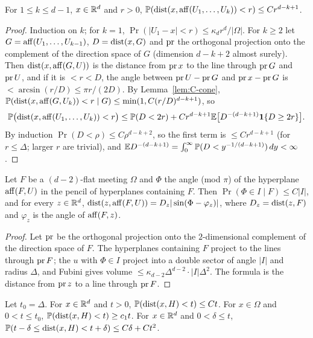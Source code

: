 \begin{lemma}\label{lem:C-flat}
For $1 \le k \le d - 1$, $x \in \mathbb{R}^d$ and $r > 0$, $\mathbb{P}(\operatorname{dist}(x, \operatorname{aff}(U_1, \dots, U_k)) < r) \le Cr^{d-k+1}$.
\end{lemma}

\begin{proof}
Induction on $k$; for $k = 1$, $\Pr(|U_1 - x| < r) \le \kappa_dr^d/|\Omega|$. For $k \ge 2$ let
$G = \operatorname{aff}(U_1, \dots, U_{k-1})$, $D = \operatorname{dist}(x, G)$ and $\operatorname{pr}$ the orthogonal projection onto the complement of the
direction space of $G$ (dimension $d - k + 2$ almost surely). Then $\operatorname{dist}(x, \operatorname{aff}(G, U))$ is the distance from
$\operatorname{pr} x$ to the line through $\operatorname{pr} G$ and $\operatorname{pr} U$, and if it is $< r < D$, the angle between $\operatorname{pr} U - \operatorname{pr} G$ and
$\operatorname{pr} x - \operatorname{pr} G$ is $< \arcsin(r/D) \le \pi r/(2D)$. By Lemma~\ref{lem:C-cone},
$\mathbb{P}(\operatorname{dist}(x, \operatorname{aff}(G, U_k)) < r \mid G) \le \min(1, C(r/D)^{d-k+1})$, so
\[
  \mathbb{P}\bigl(\operatorname{dist}(x, \operatorname{aff}(U_1, \dots, U_k)) < r\bigr) \le \mathbb{P}(D < 2r) + Cr^{d-k+1}\mathbb{E}\bigl[D^{-(d-k+1)}\mathbf{1}\{D \ge 2r\}\bigr].
\]
By induction $\Pr(D < \rho) \le C\rho^{d-k+2}$, so the first term is $\le Cr^{d-k+1}$ (for $r \le \Delta$; larger $r$ are
trivial), and $\mathbb{E} D^{-(d-k+1)} = \int_0^\infty\mathbb{P}(D < y^{-1/(d-k+1)})\,dy < \infty$.
\end{proof}

\begin{lemma}[Pencils]\label{lem:C-pencil}
Let $F$ be a $(d-2)$-flat meeting $\Omega$ and $\Phi$ the angle (mod $\pi$) of the hyperplane $\operatorname{aff}(F, U)$ in the
pencil of hyperplanes containing $F$. Then $\Pr(\Phi \in I \mid F) \le C|I|$, and for every $z \in \mathbb{R}^d$,
$\operatorname{dist}(z, \operatorname{aff}(F, U)) = D_z|\sin(\Phi - \varphi_z)|$, where $D_z = \operatorname{dist}(z, F)$ and $\varphi_z$ is the angle of
$\operatorname{aff}(F, z)$.
\end{lemma}

\begin{proof}
Let $\operatorname{pr}$ be the orthogonal projection onto the $2$-dimensional complement of the direction space of $F$. The
hyperplanes containing $F$ project to the lines through $\operatorname{pr} F$; the $u$ with $\Phi \in I$ project into a double
sector of angle $|I|$ and radius $\Delta$, and Fubini gives volume $\le \kappa_{d-2}\Delta^{d-2}\cdot|I|\Delta^2$. The
formula is the distance from $\operatorname{pr} z$ to a line through $\operatorname{pr} F$.
\end{proof}

\begin{lemma}\label{lem:C-one}
Let $t_0 = \Delta$. For $x \in \mathbb{R}^d$ and $t > 0$, $\mathbb{P}(\operatorname{dist}(x, H) < t) \le Ct$. For $x \in \Omega$ and
$0 < t \le t_0$, $\mathbb{P}(\operatorname{dist}(x, H) < t) \ge c_1t$. For $x \in \mathbb{R}^d$ and $0 < \delta \le t$,
$\mathbb{P}(t - \delta \le \operatorname{dist}(x, H) < t + \delta) \le C\delta + Ct^2$.
\end{lemma}

